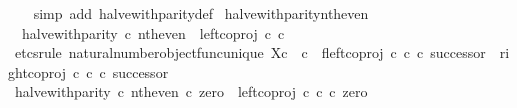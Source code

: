 \begin{isabellebody}
%
\isadelimproof
\ \ %
\endisadelimproof
%
\isatagproof
{}\isamarkupfalse%
\ {\isacharparenleft}{\kern0pt}simp\ add{\isacharcolon}{\kern0pt}\ halve{\isacharunderscore}{\kern0pt}with{\isacharunderscore}{\kern0pt}parity{\isacharunderscore}{\kern0pt}def{}{\isacharparenright}{\kern0pt}%
\endisatagproof
{\isafoldproof}%
%
\isadelimproof
\isanewline
%
\endisadelimproof
\isanewline
{}\isamarkupfalse%
\ halve{\isacharunderscore}{\kern0pt}with{\isacharunderscore}{\kern0pt}parity{\isacharunderscore}{\kern0pt}nth{\isacharunderscore}{\kern0pt}even{\isacharcolon}{\kern0pt}\isanewline
\ \ {\isachardoublequoteopen}halve{\isacharunderscore}{\kern0pt}with{\isacharunderscore}{\kern0pt}parity\ {\isasymcirc}\isactrlsub c\ nth{\isacharunderscore}{\kern0pt}even\ {\isacharequal}{\kern0pt}\ left{\isacharunderscore}{\kern0pt}coproj\ {\isasymnat}\isactrlsub c\ {\isasymnat}\isactrlsub c{\isachardoublequoteclose}\isanewline
%
\isadelimproof
%
\endisadelimproof
%
\isatagproof
{}\isamarkupfalse%
\ {\isacharparenleft}{\kern0pt}etcs{\isacharunderscore}{\kern0pt}rule\ natural{\isacharunderscore}{\kern0pt}number{\isacharunderscore}{\kern0pt}object{\isacharunderscore}{\kern0pt}func{\isacharunderscore}{\kern0pt}unique{\isacharbrackleft}{\kern0pt}\ X{\isacharequal}{\kern0pt}{\isachardoublequoteopen}{\isasymnat}\isactrlsub c\ {\isasymCoprod}\ {\isasymnat}\isactrlsub c{\isachardoublequoteclose}{\isacharcomma}{\kern0pt}\ \ f{\isacharequal}{\kern0pt}{\isachardoublequoteopen}{\isacharparenleft}{\kern0pt}left{\isacharunderscore}{\kern0pt}coproj\ {\isasymnat}\isactrlsub c\ {\isasymnat}\isactrlsub c\ {\isasymcirc}\isactrlsub c\ successor{\isacharparenright}{\kern0pt}\ {\isasymamalg}\ {\isacharparenleft}{\kern0pt}right{\isacharunderscore}{\kern0pt}coproj\ {\isasymnat}\isactrlsub c\ {\isasymnat}\isactrlsub c\ {\isasymcirc}\isactrlsub c\ successor{\isacharparenright}{\kern0pt}{\isachardoublequoteclose}{\isacharbrackright}{\kern0pt}{\isacharparenright}{\kern0pt}\isanewline
\ \ \isamarkupfalse%
\ {\isachardoublequoteopen}{\isacharparenleft}{\kern0pt}halve{\isacharunderscore}{\kern0pt}with{\isacharunderscore}{\kern0pt}parity\ {\isasymcirc}\isactrlsub c\ nth{\isacharunderscore}{\kern0pt}even{\isacharparenright}{\kern0pt}\ {\isasymcirc}\isactrlsub c\ zero\ {\isacharequal}{\kern0pt}\ left{\isacharunderscore}{\kern0pt}coproj\ {\isasymnat}\isactrlsub c\ {\isasymnat}\isactrlsub c\ {\isasymcirc}\isactrlsub c\ zero{\isachardoublequoteclose}\isanewline
\ \ \isamarkupfalse%
\ {\isacharminus}{\kern0pt}\isanewline

\end{isabellebody}
